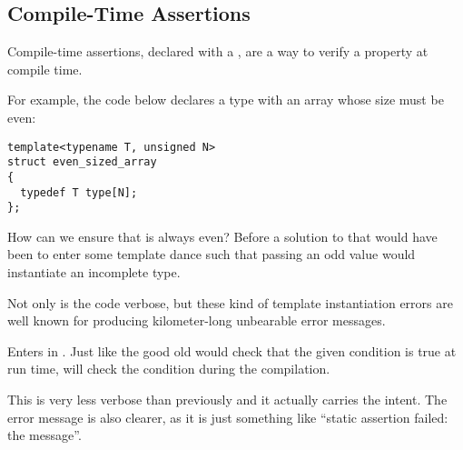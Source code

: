 \subsection{Compile-Time Assertions}

Compile-time assertions, declared with a , are a
way to verify a property at compile time.

For example, the code below declares a type with an array whose size
must be even:

\begin{lstlisting}
template<typename T, unsigned N>
struct even_sized_array
{
  typedef T type[N];
};
\end{lstlisting}

How can we ensure that  is always even? Before  a
solution to that would have been to enter some template dance such
that passing an odd value would instantiate an incomplete type.



Not only is the code verbose, but these kind of template instantiation
errors are well known for producing kilometer-long unbearable error
messages.

\bigskip

Enters  in . Just like the good old
 would check that the given condition is true
at run time,  will check the
condition during the compilation.



This is very less verbose than previously and it actually carries the
intent. The error message is also clearer, as it is just something
like ``static assertion failed: the message''.
